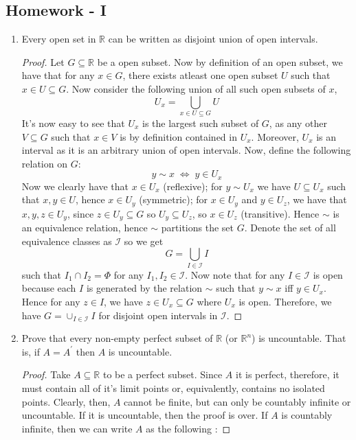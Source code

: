 \documentclass{article}
\theoremstyle{definition}
\theoremstyle{remark}
\theoremstyle{definition}
\theoremstyle{definition}
\theoremstyle{definition}
\newcommand{\union}{\cup}
\newcommand{\intrs}{\cap}
\newcommand{\bunion}{\bigcup}
\newcommand{\R}{\mathbb{R}}
\begin{document}
\subsection{Homework - I}
\begin{enumerate}
	\item{Every open set in $ \mathbb{R} $ can be written as disjoint union of open intervals.
\begin{proof}
	\label{H1-1}
	Let $ G\subseteq \R$ be a open subset. Now by definition of an open subset, we have that for any $ x\in G $, there exists atleast one open subset $ U $ such that $ x\in U \subseteq G $. Now consider the following union of all such open subsets of $ x $,
	\[U_x = \bunion_{x\in U\subseteq G} U\]
	It's now easy to see that $ U_x $ is the largest such subset of $ G $, as any other $ V\subseteq G $ such that $ x\in V $ is by definition contained in $ U_x $. Moreover, $ U_x $ is an interval as it is an arbitrary union of open intervals. Now, define the following relation on $ G $:
	\[y\sim x \;\iff\; y\in U_x\]
	Now we clearly have that $ x\in U_x $ (reflexive); for $ y\sim U_x $ we have $ U\subseteq U_x $ such that $ x,y\in U $, hence $ x\in U_y $ (symmetric); for $ x\in U_y $ and $ y\in U_z $, we have that $ x,y,z\in U_y $, since $ z\in U_y \subseteq G $ so $ U_y\subseteq U_z $, so $ x\in U_z $ (transitive). Hence $ \sim $ is an equivalence relation, hence $ \sim $ partitions the set $ G $. Denote the set of all equivalence classes as $ \mathcal{I} $ so we get 
	\[G = \bunion_{I\in \mathcal{I}} I\]
	such that $I_1\intrs I_2 = \Phi$ for any $ I_1,I_2\in \mathcal{I} $. Now note that for any $ I \in \mathcal{I}$ is open because each $ I $ is generated by the relation $ \sim $ such that $ y\sim x $ iff $ y\in U_x $. Hence for any $ z\in I $, we have $ z\in U_x \subseteq G$ where $ U_x $ is open. Therefore, we have $ G = \union_{I\in \mathcal{I}} I $ for disjoint open intervals in $ \mathcal{I} $.
\end{proof}	
}
	\item{Prove that every non-empty perfect subset of $ \mathbb{R} $ (or $ \mathbb{R}^n $) is uncountable. That is, if $ A= A^\prime $ then $ A $ is uncountable.
\begin{proof}
	Take $ A\subseteq \R $ to be a perfect subset. Since $ A $ it is perfect, therefore, it must contain all of it's limit points or, equivalently, contains no isolated points. Clearly, then, $ A $ cannot be finite, but can only be countably infinite or uncountable. If it is uncountable, then the proof is over. If $ A $ is countably infinite, then we can write $ A $ as the following :

\end{proof}}
\end{enumerate}
\end{document}
